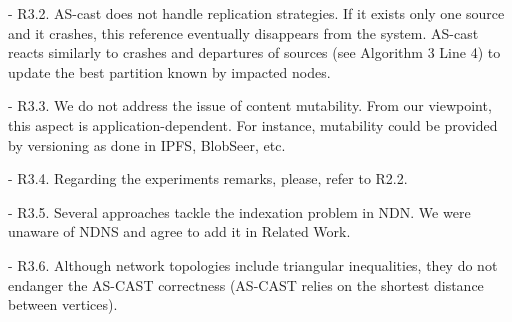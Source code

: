 - R3.2. AS-cast does not handle replication strategies. If it exists
only one source and it crashes, this reference eventually disappears
from the system. AS-cast reacts similarly to crashes and departures of
sources (see Algorithm 3 Line 4) to update the best partition known by
impacted nodes.

- R3.3. We do not address the issue of content mutability.  From our
viewpoint, this aspect is application-dependent. For instance,
mutability could be provided by versioning as done in IPFS, BlobSeer,
etc.

- R3.4. Regarding the experiments remarks, please, refer to R2.2.

- R3.5. Several approaches tackle the indexation problem in NDN. We
were unaware of NDNS and agree to add it in Related Work.

- R3.6. Although network topologies include triangular inequalities,
they do not endanger the AS-CAST correctness (AS-CAST relies on the
shortest distance between vertices).

